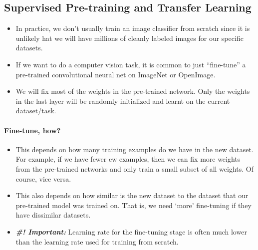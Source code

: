 \documentclass[11pt]{article}
\begin{document}
\subsection{Supervised Pre-training and Transfer Learning}
\begin{itemize}
    \item In practice, we don't usually train an image classifier from scratch since it is unlikely hat we will have millions of cleanly labeled images for our specific datasets. 
    \item If we want to do a computer vision task, it is common to just ``fine-tune'' a pre-trained convolutional neural net on ImageNet or OpenImage. 
    \item We will fix most of the weights in the pre-trained network. Only the weights in the last layer will be randomly initialized and learnt on the current dataset/task. 
\end{itemize}
\paragraph{Fine-tune, how?}
\begin{itemize}
    \item This depends on how many training examples do we have in the new dataset. For example, if we have fewer ew examples, then we can fix more weights from the pre-trained networks and only train a small subset of all weights. Of course, vice versa. 
    \item This also depends on how similar is the new dataset to the dataset that our pre-trained model was trained on. That is, we need `more' fine-tuning if they have dissimilar datasets.
    \item \textit{\textbf{\#! Important:}} Learning rate for the fine-tuning stage is often much lower than the learning rate used for training from scratch. 
\end{itemize}


\newpage


\end{document}
